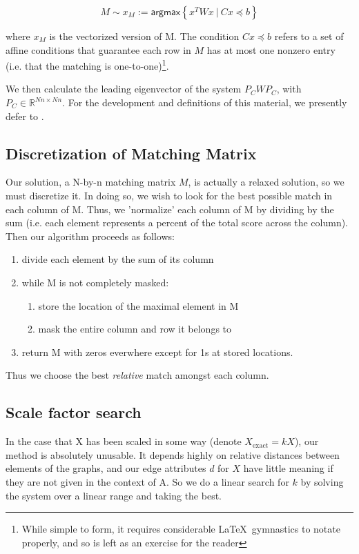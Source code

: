 \documentclass[10pt,twocolumn]{article}
\providecommand{\R}{\mathbb{R}}%
\begin{document}
{\[
  M \sim x_M := \mathsf{argmax} \left\{ x^T W x \ | \ Cx \preceq b \right\}
\]

where $x_M$ is the vectorized version of M. The condition $Cx\preceq b$ refers to a set of
affine conditions that guarantee each row in $M$ has at most one nonzero entry
(i.e. that the matching is one-to-one)\footnote{While simple to form, it
requires considerable \LaTeX \ gymnastics to notate properly, and so is left as an
exercise for the reader}.


We then calculate the leading eigenvector of the system $P_C W P_C$, with
$P_C \in \R^{Nn \times Nn}$. For the development and definitions of this material, we presently defer to \cite{c02}.

\subsection{Discretization of Matching Matrix} Our solution, a N-by-n matching
matrix $M$, is actually a relaxed solution, so we must discretize it. In doing
so, we wish to look for the best possible match in each column of M. Thus, we
'normalize' each column of M by dividing by the sum (i.e. each element
represents a percent of the total score across the column). Then our algorithm
proceeds as follows:

\begin{enumerate}
  \item divide each element by the sum of its column
  \item while M is not completely masked:
    \begin{enumerate}
        \item store the location of the maximal element in M
        \item mask the entire column and row it belongs to
    \end{enumerate}
  \item return M with zeros everwhere except for 1s at stored locations.
\end{enumerate} 
  

Thus we choose the best \emph{relative} match amongst each column.


\subsection{Scale factor search} In the case that X has been scaled in some
way (denote $X_{\mathrm{exact}} = kX$), our method is absolutely unusable. It depends highly on relative
distances between elements of the graphs, and our edge attributes $d$ for $X$
have little meaning if they are not given in the context of A. So we do a
linear search for $k$ by solving the system over a linear range and taking the
best.

}
\end{document}
